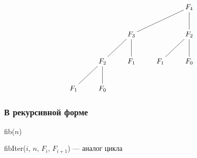 \begin{frame}
    \[
        {\xymatrix{
            *{}
                &*{}
                    &*{}
                        &*{}
                            &F_4 \ar@{-}[d]  \ar@{-}[lld]
                                \\
            *{}
                &*{}
                    &F_3 \ar@{-}[d]  \ar@{-}[ld]
                        &*{}
                            &F_2 \ar@{-}[d]  \ar@{-}[ld]
                                \\
            *{}
                &F_2 \ar@{-}[d]  \ar@{-}[ld]
                    &F_1
                        &F_1
                            &F_0
                                \\
            F_1
                &F_0
                    &*{}
                        &*{}
                            &*{}
        }}
    \]    
\end{frame}

\begin{frame}
    \begin{center}
    \end{center}
\end{frame}

\begin{frame}
    \frametitle{В рекурсивной форме}
    
    \begin{algorithm}[H]
        \caption{fib($n$)}
        \begin{algorithmic}[1]
            
        \end{algorithmic}
    \end{algorithm}
    \begin{algorithm}[H]
        \caption{fibIter($i$, $n$, $F_i$, $F_{i+1}$) --- аналог цикла}
        \begin{algorithmic}[1]
            
            \ENDIF
        \end{algorithmic}
    \end{algorithm}
\end{frame}

